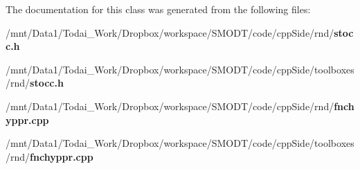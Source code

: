 The documentation for this class was generated from the following files\-:\begin{DoxyCompactItemize}
\item 
/mnt/\-Data1/\-Todai\-\_\-\-Work/\-Dropbox/workspace/\-S\-M\-O\-D\-T/code/cpp\-Side/rnd/{\bf stocc.\-h}\item 
/mnt/\-Data1/\-Todai\-\_\-\-Work/\-Dropbox/workspace/\-S\-M\-O\-D\-T/code/cpp\-Side/toolboxes/rnd/{\bf stocc.\-h}\item 
/mnt/\-Data1/\-Todai\-\_\-\-Work/\-Dropbox/workspace/\-S\-M\-O\-D\-T/code/cpp\-Side/rnd/{\bf fnchyppr.\-cpp}\item 
/mnt/\-Data1/\-Todai\-\_\-\-Work/\-Dropbox/workspace/\-S\-M\-O\-D\-T/code/cpp\-Side/toolboxes/rnd/{\bf fnchyppr.\-cpp}\end{DoxyCompactItemize}
